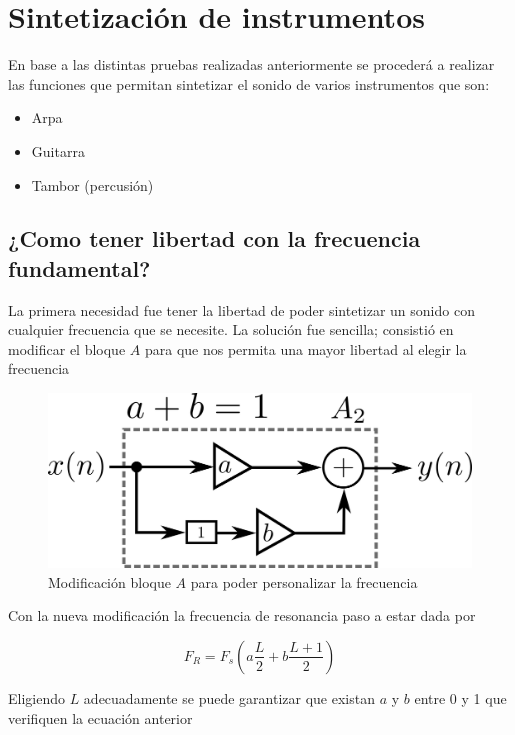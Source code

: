 \documentclass[assd_tp2_main.tex]{subfiles}
\begin{document}
\section{Sintetización de instrumentos}

En base a las distintas pruebas realizadas anteriormente se procederá a realizar las funciones que permitan sintetizar el sonido de varios instrumentos que son:
\begin{itemize}
	\item Arpa
	\item Guitarra
	\item Tambor (percusión)
\end{itemize}

\subsection{¿Como tener libertad con la frecuencia fundamental?}

La primera necesidad fue tener la libertad de poder sintetizar un sonido con cualquier frecuencia que se necesite. La solución fue sencilla; consistió en modificar el bloque $A$ para que nos permita una mayor libertad al elegir la frecuencia
\begin{figure}[H]
	\begin{center}
	\includegraphics[scale=1]{graficos/bloque4ej5.png}
	\caption{Modificación bloque $A$ para poder personalizar la frecuencia}

	\end{center}
\end{figure}

Con la nueva modificación la frecuencia de resonancia paso a estar dada por

\begin{equation}
	F_R=F_s(a\frac{L}{2}+b\frac{L+1}{2})
\end{equation}

Eligiendo $L$ adecuadamente se puede garantizar que existan $a$ y $b$ entre 0 y 1 que verifiquen la ecuación anterior

 
\end{document}
